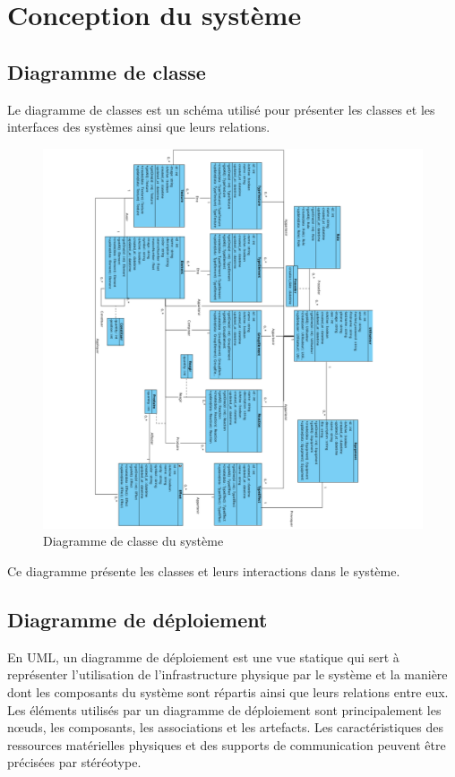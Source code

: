 \section{Conception du système}

\subsection{Diagramme de classe} %

Le diagramme de classes est un schéma utilisé pour présenter les classes et les interfaces des systèmes ainsi que leurs relations.

\begin{figure}[H]
	\centering
	\includegraphics[trim={5cm 0 0 0}, width=1\textwidth]{img/dc}
	\caption{Diagramme de classe du système}
	\label{fig:mesh1}
\end{figure}

Ce diagramme présente les classes et leurs interactions dans le système.

\subsection{Diagramme de déploiement} %

En UML, un diagramme de déploiement est une vue statique qui sert à représenter l’utilisation de l’infrastructure physique par le système et la manière dont les composants du système sont répartis ainsi que leurs relations entre eux. Les éléments utilisés par un diagramme de déploiement sont principalement les nœuds, les composants, les associations et les artefacts. Les caractéristiques des ressources matérielles physiques et des supports de communication peuvent être précisées par stéréotype.

